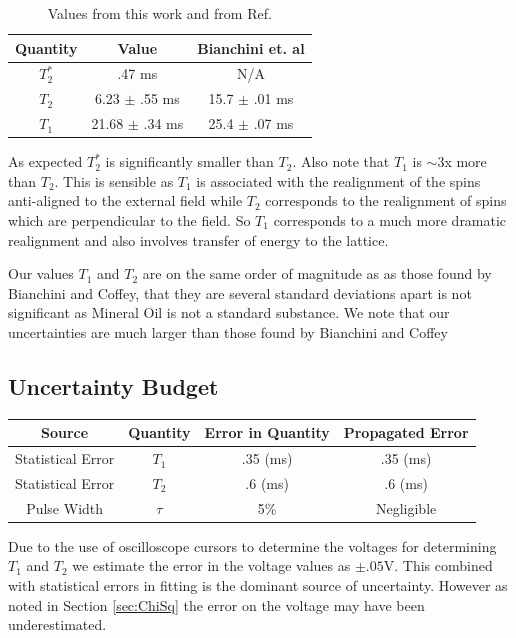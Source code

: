 \documentclass[11pt,letterpaper]{article}
\begin{document}
\begin{table}[!h]
\label{Result_Table}
\begin{center}
	\begin{tabular}{|c|c|c|}\hline
		Quantity & Value & Bianchini et. al \\ \hline\hline
		$T_2^*$ & .47 ms &  N/A \\ \hline
		$T_2$ & 6.23 $\pm$ .55 ms &  15.7 $\pm$ .01 ms \\ \hline
		$T_1$ & 21.68 $\pm$ .34 ms &  25.4 $\pm$ .07 ms\\ \hline
	
	\end{tabular}
		\caption{Values from this work and from Ref. \cite{Bianchini}}
			
		\end{center}
	\end{table}
As expected $T_2^*$ is significantly smaller than $T_2$. Also note that $T_1$ is $\sim$3x more than $T_2$. This is sensible as $T_1$ is associated with the realignment of the spins anti-aligned to the external field while $T_2$ corresponds to the realignment of spins which are perpendicular to the field. So $T_1$ corresponds to a much more dramatic realignment and also involves transfer of energy to the lattice.

Our values $T_1$ and $T_2$ are on the same order of magnitude as as those found by Bianchini and Coffey, that they are several standard deviations apart is not significant as Mineral Oil is not a standard substance. We note that our uncertainties are much larger than those found by Bianchini and Coffey

\subsection{Uncertainty Budget}
\begin{table}[!h]
	\begin{center}
		\begin{tabular}{|c|c|c|c|} \hline 
			Source & Quantity&  Error in Quantity  & Propagated Error  \\ \hline \hline
			Statistical Error & $T_1$ & .35 (ms) & .35 (ms)\\ \hline 
			Statistical Error & $T_2$ & .6 (ms)& .6 (ms)\\ \hline
			Pulse Width& $\tau$ & 5\% & Negligible\\
			\hline
		\end{tabular}
	\end{center}
\end{table}
Due to the use of oscilloscope cursors to determine the voltages for determining $T_1$ and $T_2$ we estimate the error in the voltage values as $\pm .05$V. This combined with statistical errors in fitting is the dominant source of uncertainty. However as noted in Section \ref{sec:ChiSq} the error on the voltage may have been underestimated.
\end{document}
